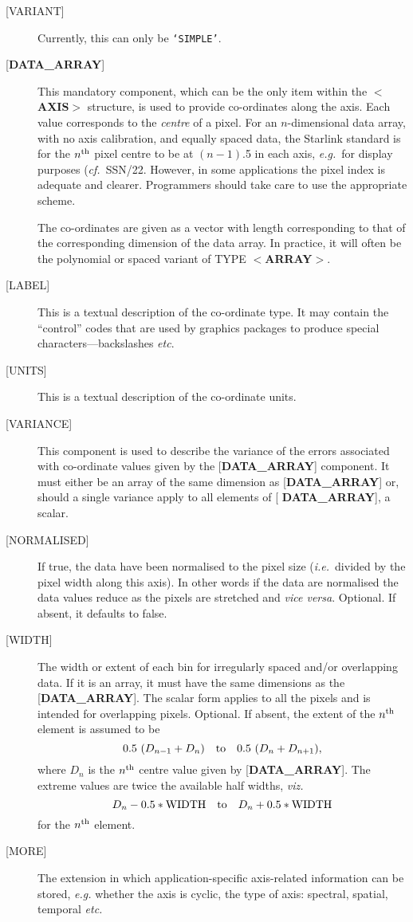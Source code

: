 \documentclass[twoside,11pt]{article}
\newcommand{\xref}[3]{#1}
\begin{document}
\begin{description}
\item [{[}VARIANT{]}]
Currently, this can only be {\tt `SIMPLE'}.
\item [{[}{\bf DATA\_ARRAY}{]}]
This mandatory component, which
can be the only item within the $<${\bf AXIS}$>$ structure,
is used to provide co-ordinates along the axis.
Each value corresponds to the {\it centre} of a pixel.  For an
$n$-dimensional data array, with no axis calibration, and equally spaced
data, the Starlink standard is for the $n^{\rm th}$ pixel centre to be at
$(n-1)$.5 in each axis, {\it e.g.}\  for display purposes
({\it cf.}\  \xref{SSN/22}{ssn22}). However, in some applications the pixel
index is adequate and clearer.  Programmers should take care to use
the appropriate scheme.

The co-ordinates are given as
a vector with length corresponding to that of the corresponding
dimension of the data array. In practice, it will often be
the polynomial or spaced variant of TYPE \mbox{$<${\bf ARRAY}$>$}.

\item [{[}LABEL{]}]
This is a textual description of the co-ordinate type.  It may
contain the ``control'' codes that are used by graphics packages
to produce special characters---backslashes {\it etc}.
\item [{[}UNITS{]}]
This is a textual description of the co-ordinate units.
\item [{[}VARIANCE{]}]
This component is used to describe the variance of the
errors associated with co-ordinate
values given by the {[}{\bf DATA\_ARRAY}{]} component.
It must either be an array of
the same dimension as {[}{\bf DATA\_ARRAY}{]} or,
should a single variance apply to all elements of {[}{\bf 
DATA\_ARRAY}{]},
a scalar.
\item [{[}NORMALISED{]}]
If true, the data have been normalised to the pixel size
({\it i.e.}\ divided by the pixel width along this axis).
In other words if the data are 
normalised the data values reduce as the pixels are stretched and {\it 
vice versa}. Optional. If absent, it defaults to false.
\item [{[}WIDTH{]}]
The width or extent of each bin for irregularly spaced
and/or overlapping data.
If it is an array, it must have
the same dimensions as the {[}{\bf DATA\_ARRAY}{]}.
The scalar form applies to all the pixels and is intended for overlapping
pixels.  Optional.  If absent, the extent of the $n^{\rm th}$
element is assumed to be
\[ 0.5~(D_{n-1}+D_n)~~~{\rm to}~~~0.5~(D_n+D_{n+1}) , \]
where $D_n$ is the $n^{\rm th}$ centre
value given by {[}{\bf DATA\_ARRAY}{]}. The
extreme values are twice the available half widths, {\it viz.}
\[ D_n - 0.5 * {\rm WIDTH} ~~~ {\rm to} ~~~ D_n + 0.5 * {\rm WIDTH} \]
for the $n^{\rm th}$ element.
\item [{[}MORE{]}] The extension in which application-specific
axis-related information can be stored,
{\it e.g.} whether the axis is cyclic, the type of axis: spectral,
spatial, temporal {\it etc.}
\end{description}
\end{document}
